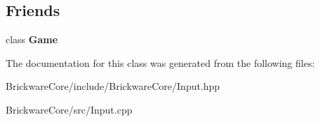 \subsection*{Friends}
\begin{DoxyCompactItemize}
\item 
\hypertarget{classBrickware_1_1Core_1_1Input_aa2fab026580d6f14280c2ffb8063a314}{}class {\bfseries Game}\label{classBrickware_1_1Core_1_1Input_aa2fab026580d6f14280c2ffb8063a314}

\end{DoxyCompactItemize}


The documentation for this class was generated from the following files\+:\begin{DoxyCompactItemize}
\item 
Brickware\+Core/include/\+Brickware\+Core/Input.\+hpp\item 
Brickware\+Core/src/Input.\+cpp\end{DoxyCompactItemize}
